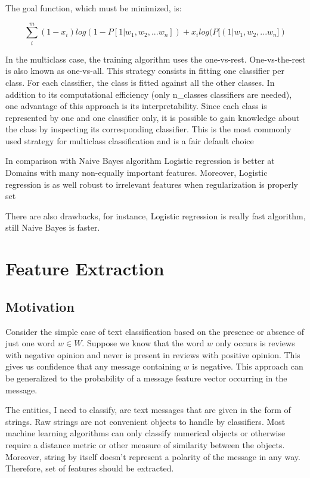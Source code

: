 \documentclass[12pt]{report}
\begin{document}
The goal function, which must be minimized, is:

$$\sum_{i}^{m} {(1 - x_i) log(1 - P[1 | w_1, w_2, ... w_n]) + x_i log(P[(1 | w_1, w_2, ... w_n])}$$

In the multiclass case, the training algorithm uses the one-vs-rest. One-vs-the-rest is also known as one-vs-all. This strategy consists in fitting one classifier per class. For each classifier, the class is fitted against all the other classes. In addition to its computational efficiency (only n_classes classifiers are needed), one advantage of this approach is its interpretability. Since each class is represented by one and one classifier only, it is possible to gain knowledge about the class by inspecting its corresponding classifier. This is the most commonly used strategy for multiclass classification and is a fair default choice %

In comparison with Naive Bayes algorithm Logistic regression is better at Domains with many non-equally important features. Moreover, Logistic regression is as well robust to irrelevant features when regularization is properly set %

There are also drawbacks, for instance, Logistic regression is really fast algorithm, still Naive Bayes is faster.

\newpage

\chapter{Feature Extraction}

\section{Motivation}

Consider the simple case of text classification based on the presence or absence of just one word $w \in W$. Suppose we know that the word $w$ only occurs is reviews with negative opinion and never is present in reviews with positive opinion. This gives us confidence that any message containing $w$ is negative. This approach can be generalized to the probability of a message feature vector occurring in the message.

The entities, I need to classify, are text messages that are given in the form of strings. Raw strings are not convenient objects to handle by classifiers. Most machine learning algorithms can only classify numerical objects or otherwise require a distance metric or other measure of similarity between the objects. Moreover, string by itself doesn't represent a polarity of the message in any way. Therefore, set of features should be extracted.
\end{document}
